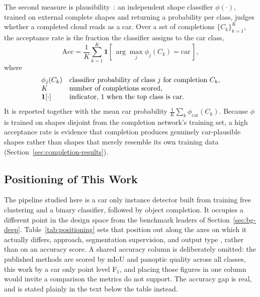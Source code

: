 \documentclass[a4paper,12pt]{report}
\begin{document}
The second measure is
plausibility~\cite{chen2020unpaired}: an independent shape classifier
$\phi(\cdot)$, trained on external complete shapes and returning a probability per class,
judges whether a completed cloud reads as a car. Over a set of completions
$\{C_k\}_{k=1}^{K}$, the acceptance rate is the fraction the classifier assigns to the car
class,
\begin{equation}
  \mathrm{Acc} = \frac{1}{K}\sum_{k=1}^{K} \mathbf{1}\!\left[\, \arg\max_j \phi_j(C_k) = \mathrm{car} \,\right],
\end{equation}
where
\[
  \begin{array}{@{}l@{\quad}l@{}}
    \phi_j(C_k) & \text{classifier probability of class } j \text{ for completion } C_k,\\
    K & \text{number of completions scored,}\\
    \mathbf{1}[\cdot] & \text{indicator, 1 when the top class is car.}
  \end{array}
\]
It is reported together with the mean car probability $\tfrac{1}{K}\sum_k \phi_{\mathrm{car}}(C_k)$.
Because $\phi$ is trained on shapes disjoint from the completion network's training set,
a high acceptance rate is evidence that completion produces genuinely car-plausible shapes
rather than shapes that merely resemble its own training data
(Section~\ref{sec:completion-results}).

\subsection{Positioning of This Work}
\label{sec:bg-positioning}

The pipeline studied here is a car only instance detector built from training free
clustering and a binary classifier, followed by object completion. It occupies a
different point in the design space from the benchmark leaders of
Section~\ref{sec:bg-deep}. Table~\ref{tab:positioning} sets that position out along the
axes on which it actually differs, approach, segmentation supervision, and output type
, rather than on an accuracy score. A shared accuracy column is deliberately omitted:
the published methods are scored by mIoU and panoptic quality across all classes, this
work by a car only point level F$_1$, and placing those figures in one column would invite
a comparison the metrics do not support. The accuracy gap is real, and is stated plainly
in the text below the table instead.
\end{document}
